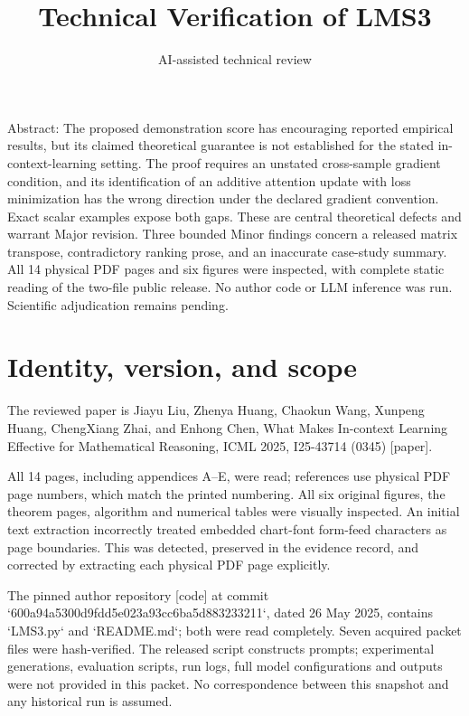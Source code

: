 \documentclass[10pt]{article}
\title{Technical Verification of LMS3}
\author{AI-assisted technical review}
\date{}
\begin{document}
\maketitle
Abstract: The proposed demonstration score has encouraging reported empirical results, but its claimed theoretical guarantee is not established for the stated in-context-learning setting. The proof requires an unstated cross-sample gradient condition, and its identification of an additive attention update with loss minimization has the wrong direction under the declared gradient convention. Exact scalar examples expose both gaps. These are central theoretical defects and warrant Major revision. Three bounded Minor findings concern a released matrix transpose, contradictory ranking prose, and an inaccurate case-study summary. All 14 physical PDF pages and six figures were inspected, with complete static reading of the two-file public release. No author code or LLM inference was run. Scientific adjudication remains pending.\par
\section*{Identity, version, and scope}
The reviewed paper is Jiayu Liu, Zhenya Huang, Chaokun Wang, Xunpeng Huang, ChengXiang Zhai, and Enhong Chen, What Makes In-context Learning Effective for Mathematical Reasoning, ICML 2025, I25-43714 (0345) [paper].\par
All 14 pages, including appendices A–E, were read; references use physical PDF page numbers, which match the printed numbering. All six original figures, the theorem pages, algorithm and numerical tables were visually inspected. An initial text extraction incorrectly treated embedded chart-font form-feed characters as page boundaries. This was detected, preserved in the evidence record, and corrected by extracting each physical PDF page explicitly.\par
The pinned author repository [code] at commit `600a94a5300d9fdd5e023a93cc6ba5d883233211`, dated 26 May 2025, contains `LMS3.py` and `README.md`; both were read completely. Seven acquired packet files were hash-verified. The released script constructs prompts; experimental generations, evaluation scripts, run logs, full model configurations and outputs were not provided in this packet. No correspondence between this snapshot and any historical run is assumed.\par
\end{document}
